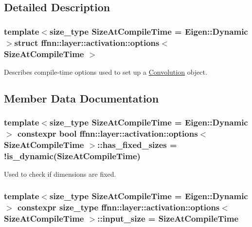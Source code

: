 \subsection{Detailed Description}
\subsubsection*{template$<$size\-\_\-type Size\-At\-Compile\-Time = Eigen\-::\-Dynamic$>$struct ffnn\-::layer\-::activation\-::options$<$ Size\-At\-Compile\-Time $>$}

Describes compile-\/time options used to set up a \hyperlink{classffnn_1_1layer_1_1_convolution}{Convolution} object. 

\subsection{Member Data Documentation}
\hypertarget{structffnn_1_1layer_1_1activation_1_1options_a13a10e2f2f0c480715aa64ef95d32c57}{
\subsubsection[{has\-\_\-fixed\-\_\-sizes}]{\setlength{\rightskip}{0pt plus 5cm}template$<$size\-\_\-type Size\-At\-Compile\-Time = Eigen\-::\-Dynamic$>$ constexpr bool {\bf ffnn\-::layer\-::activation\-::options}$<$ Size\-At\-Compile\-Time $>$\-::has\-\_\-fixed\-\_\-sizes = !{\bf is\-\_\-dynamic}(Size\-At\-Compile\-Time)\hspace{0.3cm}{\ttfamily [static]}}}\label{structffnn_1_1layer_1_1activation_1_1options_a13a10e2f2f0c480715aa64ef95d32c57}


Used to check if dimensions are fixed. 

\hypertarget{structffnn_1_1layer_1_1activation_1_1options_ae32f71e7e41f1adc1c29eb94d8138cab}{
\subsubsection[{input\-\_\-size}]{\setlength{\rightskip}{0pt plus 5cm}template$<$size\-\_\-type Size\-At\-Compile\-Time = Eigen\-::\-Dynamic$>$ constexpr {\bf size\-\_\-type} {\bf ffnn\-::layer\-::activation\-::options}$<$ Size\-At\-Compile\-Time $>$\-::input\-\_\-size = Size\-At\-Compile\-Time\hspace{0.3cm}{\ttfamily [static]}}}\label{structffnn_1_1layer_1_1activation_1_1options_ae32f71e7e41f1adc1c29eb94d8138cab}


